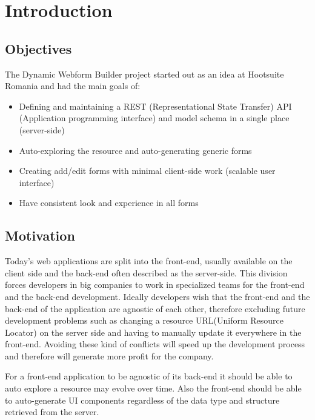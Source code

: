 \chapter{Introduction}
\label{chapter:intro}

\section{Objectives}
\label{sec:objectives}

The Dynamic Webform Builder project started out as an idea at Hootsuite Romania and had the main goals of:
\begin{itemize}
	
	\item Defining and maintaining a REST (Representational State Transfer) API (Application programming interface) and model schema in a single place (server-side)
	
	\item Auto-exploring the resource and auto-generating generic forms
	
	\item Creating add/edit forms with minimal client-side work (scalable user interface)
	
	\item Have consistent look and experience in all forms
	
\end{itemize}

\section{Motivation}
\label{sec:motivation}

Today's web applications are split into the front-end, usually available on the client side and the back-end often described as the server-side. This division forces developers in big companies to work in specialized teams for the front-end and the back-end development. Ideally developers wish that the front-end and the back-end of the application are agnostic of each other, therefore excluding future development problems such as changing a resource URL(Uniform Resource Locator) on the server side and having to manually update it everywhere in the front-end. Avoiding these kind of conflicts will speed up the development process and therefore will generate more profit for the company.

For a front-end application to be agnostic of its back-end it should be able to auto explore a resource may evolve over time. Also the front-end should be able to auto-generate UI components regardless of the data type and structure retrieved from the server.


